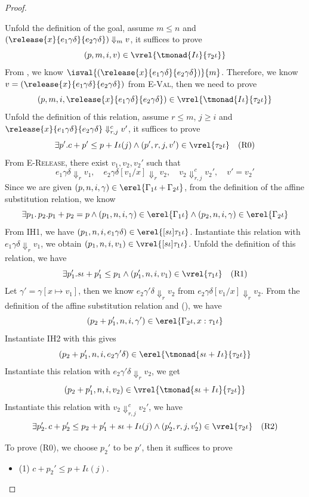 \begin{proof}
\begin{itemize}
Unfold the definition of the goal, assume $m\leq n$ and $(\release{x}{e_1\gamma\delta}{e_2\gamma\delta}) \Downarrow_m v$, it suffices to prove
\[(p, m, i, v) \in \vrel{\tmonad{I\iota}{\tau_2 \iota}} \]
From , we know $\isval{(\release{x}{e_1\gamma\delta}{e_2\gamma\delta})}{m}$.
Therefore, we know $v= (\release{x}{e_1\gamma\delta}{e_2\gamma\delta})$ from \textsc{E-Val}, then we need to prove 
\[
(p, m, i, \release{x}{e_1\gamma\delta}{e_2\gamma\delta}) \in \vrel{\tmonad{I\iota}{\tau_2\iota}}
\]
Unfold the definition of this relation, assume $r \leq m$, $j\ge i$ and $\release{x}{e_1\gamma\delta}{e_2\gamma\delta} \Downarrow^{c}_{r, j} v'$, it suffices to prove
\[\exists p'. c+p' \leq p+I\iota(j) \land (p', r, j, v') \in \vrel{{\tau_2\iota}} \quad (\text{R0})\]
From \textsc{E-Release}, there exist $v_1, v_2, v_2'$ such that 
\[e_1\gamma\delta \Downarrow_r v_1, \quad e_2\gamma\delta[v_1/x] \Downarrow_r v_2, \quad v_2 \Downarrow^c_{r,j} v_2',
\quad v' = v_2'\]
Since we are given $(p,n,i, \gamma) \in \erel{\Gamma_1\iota + \Gamma_2\iota}$, from the definition of the affine substitution relation, we know 
\[ \exists p_1.\, p_2. p_1+p_2 = p \land (p_1,n,i, \gamma) \in \erel{\Gamma_1\iota} \land (p_2,n,i, \gamma) \in \erel{\Gamma_2\iota}\]
From IH1, we have $(p_1, n, i, e_1\gamma\delta) \in \erel{[s\iota]\tau_1\iota}$. Instantiate this relation with $e_1\gamma\delta \Downarrow_r v_1$, we obtain $(p_1,n,i,v_1) \in \vrel{[s\iota]\tau_1\iota}$.
Unfold the definition of this relation, we have 
\[\exists p_1'. s\iota + p_1' \leq p_1 \land (p_1', n, i, v_1) \in \vrel{\tau_1\iota} \quad (\text{R1})\]
Let $\gamma' = \gamma[x\mapsto v_1]$, then we know $e_2\gamma'\delta \Downarrow_r v_2$ from $e_2\gamma\delta[v_1/x] \Downarrow_r v_2$.
From the definition of the affine substitution relation and (), we have 
\[(p_2+p_1', n, i, \gamma') \in \erel{\Gamma_2\iota, x:\tau_1\iota}\]
Instantiate IH2 with this gives
\[(p_2+p_1', n, i, e_2\gamma'\delta) \in \erel{\tmonad{s\iota+I\iota}{\tau_2\iota}}\]
Instantiate this relation with $e_2\gamma'\delta \Downarrow_r v_2$, we get 
\[(p_2+p_1', n, i, v_2) \in \vrel{\tmonad{s\iota+I\iota}{\tau_2\iota}}\]
Instantiate this relation with $v_2 \Downarrow^c_{r,j} v_2'$, we have 
\[\exists p_2'.\,c+p_2' \leq p_2+p_1'+ s\iota + I\iota(j) \land (p_2', r, j, v_2') \in \vrel{\tau_2\iota} \quad (\text{R2})\]

To prove (R0), we choose $p_2'$ to be $p'$, then it suffices to prove 
\begin{itemize}
  \item (1) $c+p_2' \leq p+I\iota(j)$.


\end{itemize}
\end{itemize}
\end{proof}
